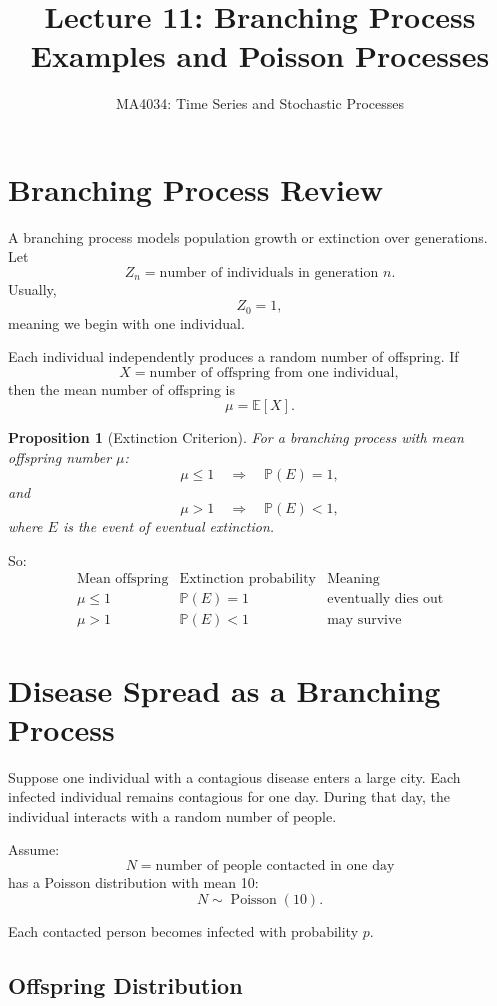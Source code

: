 \documentclass[12pt,a4paper]{article}
\title{\textbf{Lecture 11: Branching Process Examples and Poisson Processes}}
\author{MA4034: Time Series and Stochastic Processes}
\date{}
\theoremstyle{lecturestyle}
\newtheorem{proposition}{Proposition}
\newcommand{\Prob}{\mathbb{P}}
\newcommand{\E}{\mathbb{E}}
\begin{document}
\maketitle

\section{Branching Process Review}

A branching process models population growth or extinction over generations. Let
\[
Z_n=\text{number of individuals in generation }n.
\]
Usually,
\[
Z_0=1,
\]
meaning we begin with one individual.

Each individual independently produces a random number of offspring. If
\[
X=\text{number of offspring from one individual},
\]
then the mean number of offspring is
\[
\mu=\E[X].
\]

\begin{proposition}[Extinction Criterion]
For a branching process with mean offspring number $\mu$:
\[
\mu\leq 1 \quad\Longrightarrow\quad \Prob(E)=1,
\]
and
\[
\mu>1 \quad\Longrightarrow\quad \Prob(E)<1,
\]
where $E$ is the event of eventual extinction.
\end{proposition}

So:
\[
\begin{array}{c|c|c}
\text{Mean offspring} & \text{Extinction probability} & \text{Meaning}\\
\hline
\mu\leq 1 & \Prob(E)=1 & \text{eventually dies out}\\
\mu>1 & \Prob(E)<1 & \text{may survive}
\end{array}
\]

\section{Disease Spread as a Branching Process}

Suppose one individual with a contagious disease enters a large city. Each infected individual remains contagious for one day. During that day, the individual interacts with a random number of people.

Assume:
\[
N=\text{number of people contacted in one day}
\]
has a Poisson distribution with mean 10:
\[
N\sim \operatorname{Poisson}(10).
\]

Each contacted person becomes infected with probability $p$.

\subsection{Offspring Distribution}
\end{document}
